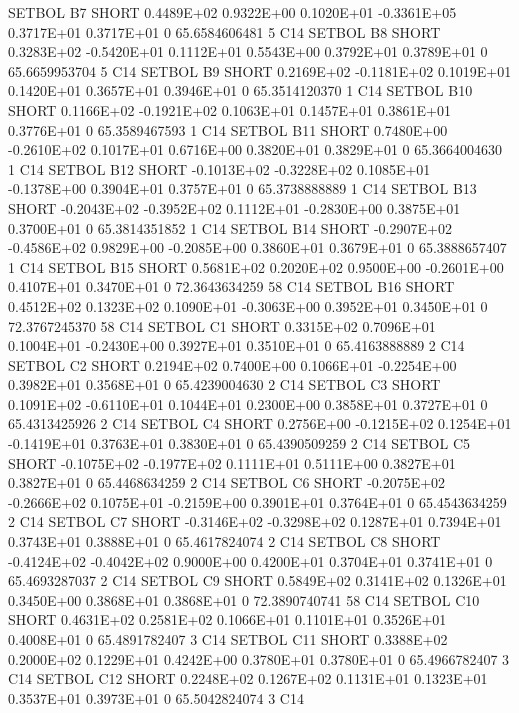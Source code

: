 \documentclass[twoside,11pt,nolof]{starlink}
\begin{document}
\begin{landscape}
\begin{small}
\begin{terminalv}
{{{{{ SETBOL B7  SHORT     0.4489E+02  0.9322E+00  0.1020E+01 -0.3361E+05  0.3717E+01  0.3717E+01  0  65.6584606481   5 C14
 SETBOL B8  SHORT     0.3283E+02 -0.5420E+01  0.1112E+01  0.5543E+00  0.3792E+01  0.3789E+01  0  65.6659953704   5 C14
 SETBOL B9  SHORT     0.2169E+02 -0.1181E+02  0.1019E+01  0.1420E+01  0.3657E+01  0.3946E+01  0  65.3514120370   1 C14
 SETBOL B10 SHORT     0.1166E+02 -0.1921E+02  0.1063E+01  0.1457E+01  0.3861E+01  0.3776E+01  0  65.3589467593   1 C14
 SETBOL B11 SHORT     0.7480E+00 -0.2610E+02  0.1017E+01  0.6716E+00  0.3820E+01  0.3829E+01  0  65.3664004630   1 C14
 SETBOL B12 SHORT    -0.1013E+02 -0.3228E+02  0.1085E+01 -0.1378E+00  0.3904E+01  0.3757E+01  0  65.3738888889   1 C14
 SETBOL B13 SHORT    -0.2043E+02 -0.3952E+02  0.1112E+01 -0.2830E+00  0.3875E+01  0.3700E+01  0  65.3814351852   1 C14
 SETBOL B14 SHORT    -0.2907E+02 -0.4586E+02  0.9829E+00 -0.2085E+00  0.3860E+01  0.3679E+01  0  65.3888657407   1 C14
 SETBOL B15 SHORT     0.5681E+02  0.2020E+02  0.9500E+00 -0.2601E+00  0.4107E+01  0.3470E+01  0  72.3643634259  58 C14
 SETBOL B16 SHORT     0.4512E+02  0.1323E+02  0.1090E+01 -0.3063E+00  0.3952E+01  0.3450E+01  0  72.3767245370  58 C14
 SETBOL C1  SHORT     0.3315E+02  0.7096E+01  0.1004E+01 -0.2430E+00  0.3927E+01  0.3510E+01  0  65.4163888889   2 C14
 SETBOL C2  SHORT     0.2194E+02  0.7400E+00  0.1066E+01 -0.2254E+00  0.3982E+01  0.3568E+01  0  65.4239004630   2 C14
 SETBOL C3  SHORT     0.1091E+02 -0.6110E+01  0.1044E+01  0.2300E+00  0.3858E+01  0.3727E+01  0  65.4313425926   2 C14
 SETBOL C4  SHORT     0.2756E+00 -0.1215E+02  0.1254E+01 -0.1419E+01  0.3763E+01  0.3830E+01  0  65.4390509259   2 C14
 SETBOL C5  SHORT    -0.1075E+02 -0.1977E+02  0.1111E+01  0.5111E+00  0.3827E+01  0.3827E+01  0  65.4468634259   2 C14
 SETBOL C6  SHORT    -0.2075E+02 -0.2666E+02  0.1075E+01 -0.2159E+00  0.3901E+01  0.3764E+01  0  65.4543634259   2 C14
 SETBOL C7  SHORT    -0.3146E+02 -0.3298E+02  0.1287E+01  0.7394E+01  0.3743E+01  0.3888E+01  0  65.4617824074   2 C14
 SETBOL C8  SHORT    -0.4124E+02 -0.4042E+02  0.9000E+00  0.4200E+01  0.3704E+01  0.3741E+01  0  65.4693287037   2 C14
 SETBOL C9  SHORT     0.5849E+02  0.3141E+02  0.1326E+01  0.3450E+00  0.3868E+01  0.3868E+01  0  72.3890740741  58 C14
 SETBOL C10 SHORT     0.4631E+02  0.2581E+02  0.1066E+01  0.1101E+01  0.3526E+01  0.4008E+01  0  65.4891782407   3 C14
 SETBOL C11 SHORT     0.3388E+02  0.2000E+02  0.1229E+01  0.4242E+00  0.3780E+01  0.3780E+01  0  65.4966782407   3 C14
 SETBOL C12 SHORT     0.2248E+02  0.1267E+02  0.1131E+01  0.1323E+01  0.3537E+01  0.3973E+01  0  65.5042824074   3 C14
}}}}}
\end{terminalv}
\end{small}
\end{landscape}
\end{document}
